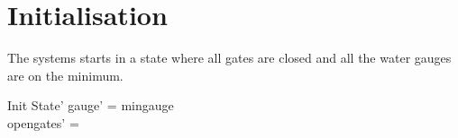 \documentclass[a4paper]{article}
\begin{document}
\section{Initialisation}
The systems starts in a state where all gates are closed and
all the water gauges are on the minimum.
\begin{schema}{Init}
  State'
  \where
  gauge' = mingauge\\
  opengates' = \emptyset\\
\end{schema}
\end{document}
